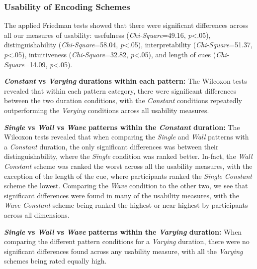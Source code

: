 \documentclass{mpaper}
\begin{document}
\subsubsection{Usability of Encoding Schemes}
The applied Friedman tests showed that there were significant differences across all our measures of usability: usefulness (\textit{Chi-Square}=49.16, \textit{p}<.05), distinguishability (\textit{Chi-Square}=58.04, \textit{p}<.05), interpretability (\textit{Chi-Square}=51.37, \textit{p}<.05), intuitiveness (\textit{Chi-Square}=32.82, \textit{p}<.05), and length of cues (\textit{Chi-Square}=14.09, \textit{p}<.05).

\textbf{\textit{Constant} vs \textit{Varying} durations within each pattern:} The Wilcoxon tests revealed that within each pattern category, there were significant differences between the two duration conditions, with the \textit{Constant} conditions repeatedly outperforming the \textit{Varying} conditions across all usability measures.

\textbf{\textit{Single} vs \textit{Wall} vs \textit{Wave} patterns within the \textit{Constant} duration:} The Wilcoxon tests revealed that when comparing the \textit{Single} and \textit{Wall} patterns with a \textit{Constant} duration, the only significant differences was between their distinguishability, where the \textit{Single} condition was ranked better. In-fact, the \textit{Wall Constant} scheme was ranked the worst across all the usability measures, with the exception of the length of the cue, where participants ranked the \textit{Single Constant} scheme the lowest. Comparing the \textit{Wave} condition to the other two, we see that significant differences were found in many of the usability measures, with the \textit{Wave Constant} scheme being ranked the highest or near highest by participants across all dimensions.

\textbf{\textit{Single} vs \textit{Wall} vs \textit{Wave} patterns within the \textit{Varying} duration:} When comparing the different pattern conditions for a \textit{Varying} duration, there were no significant differences found across any usability measure, with all the \textit{Varying} schemes being rated equally high.
\end{document}
